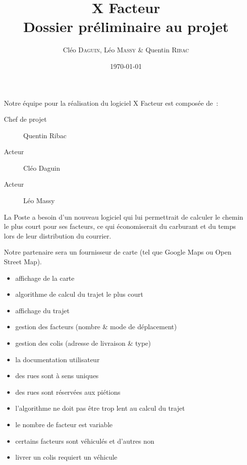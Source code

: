 \documentclass[a4paper, 12pt]{article}
\title{X Facteur\\Dossier préliminaire au projet}
\author{Cléo \textsc{Daguin}, Léo \textsc{Massy} \& Quentin \textsc{Ribac}}
\date{\today}
\begin{document}
\maketitle
\renewcommand{\contentsname}{Sommaire}
\tableofcontents
\newpage

Notre équipe pour la réalisation du logiciel X Facteur est composée de :
\begin{description}
\item[Chef de projet] Quentin Ribac
\item[Acteur] Cléo Daguin
\item[Acteur] Léo Massy
\end{description}


La Poste a besoin d’un nouveau logiciel qui lui permettrait de calculer le chemin le plus court pour
ses facteurs, ce qui économiserait du carburant et du temps lors de leur distribution du courrier.

Notre partenaire sera un fournisseur de carte (tel que Google Maps ou Open Street Map).

\clearpage
{}
\begin{itemize}
\item affichage de la carte
\item algorithme de calcul du trajet le plus court
\item affichage du trajet
\item gestion des facteurs (nombre \& mode de déplacement)
\item gestion des colis (adresse de livraison \& type)
\end{itemize}

\begin{itemize}
\item la documentation utilisateur
\end{itemize}

\begin{itemize}
\item des rues sont à sens uniques
\item des rues sont réservées aux piétions
\item l’algorithme ne doit pas être trop lent au calcul du trajet
\item le nombre de facteur est variable
\item certains facteurs sont véhiculés et d’autres non
\item livrer un colis requiert un véhicule
\end{itemize}
\end{document}
